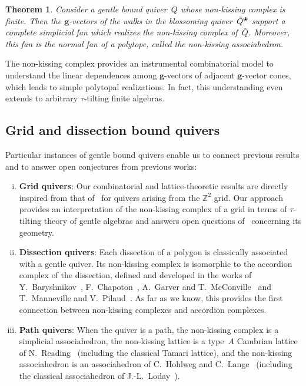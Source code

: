 \documentclass{amsart}
\newtheorem*{theorem*}{Theorem}%
\theoremstyle{definition}
\newcommand{\Z}{\mathbb{Z}} %
\renewcommand{\b}[1]{\mathbf{#1}} %
\newcommand{\blossom}{^\text{\ding{96}}} %
\begin{document}
\begin{theorem*}
Consider a gentle bound quiver~$\bar Q$ whose non-kissing complex is finite.
Then the \mbox{$\b{g}$-vectors} of the walks in the blossoming quiver~$\bar Q\blossom$ support a complete simplicial fan which realizes the non-kissing complex of~$\bar Q$.
Moreover, this fan is the normal fan of a polytope, called the non-kissing associahedron.
\end{theorem*}

\noindent
The non-kissing complex provides an instrumental combinatorial model to understand the linear dependences among $\b{g}$-vectors of adjacent $\b{g}$-vector cones, which leads to simple polytopal realizations.
In fact, this understanding even extends to arbitrary $\tau$-tilting finite algebras.


\subsection*{Grid and dissection bound quivers}

Particular instances of gentle bound quivers enable us to connect previous results and to answer open conjectures from previous works:
\begin{enumerate}[(i)]
\item \textbf{Grid quivers}: Our combinatorial and lattice-theoretic results are directly inspired from that of~\cite{PetersenPylyavskyySpeyer, SantosStumpWelker, McConville, GarverMcConville-grid} for quivers arising from the $\Z^2$ grid. Our approach provides an interpretation of the non-kissing complex of a grid in terms of $\tau$-tilting theory of gentle algebras and answers open questions of~\cite{GarverMcConville-grid} concerning its geometry.
\item \textbf{Dissection quivers}: Each dissection of a polygon is classically associated with a gentle quiver. Its non-kissing complex is isomorphic to the accordion complex of the dissection, defined and developed in the works of Y.~Baryshnikov~\cite{Baryshnikov}, F.~Chapoton~\cite{Chapoton-quadrangulations}, A.~Garver and T.~McConville~\cite{GarverMcConville} and T.~Manneville and V.~Pilaud~\cite{MannevillePilaud-accordion}. As far as we know, this provides the first connection between non-kissing complexes and accordion complexes.
\item \textbf{Path quivers}: When the quiver is a path, the non-kissing complex is a simplicial associahedron, the non-kissing lattice is a type~$A$ Cambrian lattice of N.~Reading~\cite{Reading-CambrianLattices} (including the classical Tamari lattice), and the non-kissing associahedron is an associahedron of C.~Hohlweg and C.~Lange~\cite{HohlwegLange} (including the classical associahedron of J.-L.~Loday~\cite{Loday}).
\end{enumerate}
\end{document}
